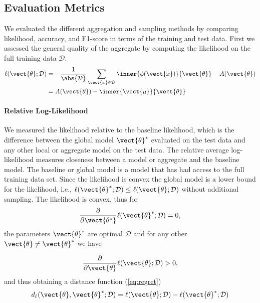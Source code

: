 \subsection{Evaluation Metrics}
\label{sec:evaluation}
We evaluated the different aggregation and sampling methods by comparing likelihood, accuracy, and F1-score in terms of the training and test data. 
First we assessed the general quality of the aggregate by computing the likelihood on the full training data $\mathcal{D}$.
\begin{equation}
    \begin{split}
        \ell(\vect{\theta} ; \mathcal{D}) &= -\frac{1}{\abs{\mathcal{D}}} \sum_{\vect{x} \in \mathcal{D}} \inner{\phi(\vect{x})}{\vect{\theta}} - A(\vect{\theta}) \\    
        &= A(\vect{\theta}) - \inner{\vect{\mu}}{\vect{\theta}}
    \end{split}
\end{equation}

\paragraph*{Relative Log-Likelihood}
We measured the likelihood relative to the baseline likelihood, which is the difference between the global model $\vect{\theta}^*$ evaluated on the test data and any other local or aggregate model on the test data. 
The relative average log-likelihood measures closeness between a model or aggregate and the baseline model. 
The baseline or global model is a model that has had access to the full training data set.
Since the likelihood is convex the global model is a lower bound for the likelihood, i.e., $\ell(\vect{\theta}^* ; \mathcal{D}) \leq   \ell(\vect{\theta} ; \mathcal{D})$ without additional sampling.
The likelihood is convex, thus for 
\begin{equation}
    \frac{\partial}{\partial \vect{\theta^*}} \ell(\vect{\theta}^* ; \mathcal{D})  = 0,
\end{equation}
the parameters $\vect{\theta}^*$ are optimal \wrt $\mathcal{D}$ and for any other $\vect{\theta} \neq \vect{\theta}^*$ we have 

\begin{equation}
    \frac{\partial}{\partial \vect{\theta}} \ell(\vect{\theta} ; \mathcal{D})  > 0,
\end{equation}
and thus obtaining a distance function (\autoref{eq:regret})
\begin{equation}
\label{eq:dist_ll}
d_{\ell}(\vect{\theta}, \vect{\theta}^*; \mathcal{D}) = \ell(\vect{\theta} ; \mathcal{D}) -    \ell(\vect{\theta}^* ; \mathcal{D})
\end{equation}

